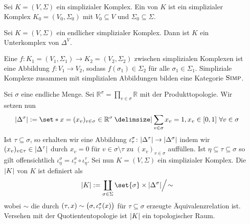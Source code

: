 \begin{definition}[{name=[Unterkomplex]}]
	Sei $K=(V, \Sigma)$ ein simplizialer Komplex. 
	Ein  von $K$ ist ein simplizialer Komplex $K_0 = (V_0, \Sigma_0)$ mit $V_0 \subseteq V$ und $\Sigma_0 \subseteq \Sigma$.
	
	Sei $K=(V,\Sigma)$ ein endlicher simplizialer Komplex. 
	Dann ist $K$ ein Unterkomplex von $\Delta^V$.
\end{definition}

\begin{definition}[{name=[simpliziale Abbildung]},label=def:25]
	Eine  $f \colon K_1=(V_1, \Sigma_1) \to K_2=(V_2, \Sigma_2)$ zwischen simplizialen Komplexen ist eine Abbildung $f \colon V_1 \to V_2$, sodass $f(\sigma_1) \in \Sigma_2$ für alle $\sigma_1 \in \Sigma_1$. 
	Simpliziale Komplexe zusammen mit simplizialen Abbildungen bilden eine Kategorie $\SIMP$.
\end{definition}

\begin{definition}[{name=[geometrische Realisierung]}]
	Sei $\sigma$ eine endliche Menge. 
	Sei $\mathbb{R}^\sigma = \prod_{v \in \sigma} \mathbb{R}$ mit der Produkttopologie. 
	Wir setzen nun 
	\[
		\abs*{\Delta^\sigma} := \set*{x=(x_v)_{v \in \sigma} \in \mathbb{R}^\sigma \given \sum_{v \in \sigma}x_v = 1 , x_v \in [0,1] \,\, \forall v \in \sigma}  
	\]
	Ist $\tau \subseteq \sigma$, so erhalten wir eine Abbildung $\iota_\tau^\sigma \colon \abs*{\Delta^\tau} \to \abs*{\Delta^\sigma}$ indem wir $(x_v)_{v \in \tau} \in \abs*{\Delta^\tau}$ durch $x_v=0$ für $v \in \sigma \setminus \tau$ zu $(x_v)_{v \in \sigma}$ auffüllen. 
	Ist $\eta \subseteq \tau \subseteq \sigma$ so gilt offensichtlich $\iota^\sigma_\eta = \iota_\tau^\sigma \circ  \iota_\eta^\tau$.
	Sei nun $K=(V, \Sigma)$ ein simplizialer Komplex. 
	Die  $\abs*{K}$ von $K$ ist definiert als 
	\[
		\abs*{K} := \coprod_{\sigma \in \Sigma} \set{\sigma} \times \abs*{\Delta^\sigma} \Big/ \!\sim
	\] 
	wobei $\sim$ die durch $(\tau, x) \sim \enbrace[\big]{\sigma, \iota_\tau^\sigma(x)}$ für $\tau \subseteq \sigma$ erzeugte Äquivalenzrelation ist. 
	Versehen mit der Quotiententopologie ist $\abs*{K}$ ein topologischer Raum.
\end{definition}

